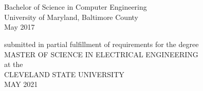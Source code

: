 \newpage
\thispagestyle{empty}

\begin{center}
  \vfill

  \MakeUppercase{\@title}\\
  \vfill
 
  \MakeUppercase{\@author}\\
  \bigskip
  Bachelor of Science in Computer Engineering\\
  University of Maryland, Baltimore County\\
  May 2017
  \vspace*{\fill}

  submitted in partial fulfillment of requirements for the degree\\
  MASTER OF SCIENCE IN ELECTRICAL ENGINEERING\\
  at the\\
  CLEVELAND STATE UNIVERSITY\\
  MAY 2021\\
         
\end{center}
